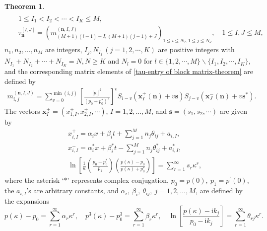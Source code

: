 \documentclass[preprint,3p,10pt]{elsarticle}
\theoremstyle{definition}
\newtheorem{theorem}{Theorem}[section]
\begin{document}
\begin{theorem}
\begin{eqnarray}
\\
&& 1\leq I_1<I_2<\cdots<I_K\leq M,
\\
&& \tau_{\mathbf{n}}^{[I, J]}=\left(m_{(M+1)(i-1)+I,(M+1) (j-1)+J}^{(\mathbf{n},I, J)}\right)_{1 \leq i \leq N_I, 1 \leq j \leq N_J}, \quad 1 \leq I, J \leq M,  \label{tau-entry of block matrix-theorem}
\end{eqnarray}
$n_1, n_2, \ldots, n_M $ are integers,  $ I_j, N_{I_j} \, (j=1,2,\cdots,K)$  are positive integers with $N_{I_1}+N_{I_2}+\cdots+N_{I_K} = N, N \geq K$ and $N_l = 0$ for $l \in \{1,2,\cdots,M\}  \backslash \{I_1,I_2,\cdots,I_K\}$, and the corresponding matrix elements of \eqref{tau-entry of block matrix-theorem} are defined by
\begin{eqnarray} \label{eqn: definition of mij}
    m_{i, j}^{(\mathbf{n},I, J)}=\sum_{v=0}^{\min (i, j)}\left[\frac{\left|p_{1}\right|^{2}}{\left(p_{0}+p_{0}^{*}\right)^{2}}\right]^{v} S_{i-v}\left(\mathbf{x}_I^{+}(\mathbf{n})+v \mathbf{s}\right) S_{j-v}\left(\mathbf{x}_J^{-}(\mathbf{n})+v \mathbf{s}^{*}\right).
\end{eqnarray}
The vectors $\mathbf{x}_{I}^{\pm}
=\left(x_{1,I}^{\pm}, x_{2,I}^{\pm}, \cdots\right)$, $I=1,2,\dots,M$,
and $\mathbf{s}=\left(s_{1}, s_{2}, \cdots\right)$
are given by
\begin{eqnarray}
&&x_{i,I}^{+}=\alpha_i x+\beta_i t+ \sum_{j=1}^{M}n_j \theta_{ij} + a_{i,I}, \label{values of x+} \\
&&x_{i,I}^{-}=\alpha_i^* x+\beta_i^* t-\sum_{j=1}^{M}n_j \theta_{ij}^* +a_{i,I}^*,\\
&&\ln \left[\frac{1}{\kappa}\left(\frac{p_{0}+p_{0}^{*}}{p_{1}}\right)\left(\frac{p(\kappa)-p_{0}}{p(\kappa)+p_{0}^{*}}\right)\right]=\sum_{r=1}^{\infty} s_{r} \kappa^{r}, \label{sr}
\end{eqnarray}
where the asterisk `$*$' represents complex conjugation, $p_0=p(0),~p_1=p^{\prime}(0)$, the $a_{i,I}$'s are arbitrary constants, and $\alpha_i,~\beta_i,~\theta_{ij},~j = 1, 2, \dots, M$, are defined by the expansions
$$
p(\kappa)-p_{0}=\sum_{r=1}^{\infty} \alpha_{r} \kappa^{r}, \quad p^{3}(\kappa)-p_{0}^{3}=\sum_{r=1}^{\infty} \beta_{r} \kappa^{r},\quad\ln \left[\frac{p(\kappa)-\mathrm{i} k_{j}}{p_{0}-\mathrm{i} k_{j}}\right]=\sum_{r=1}^{\infty} \theta_{rj} \kappa^{r}.
$$
\end{theorem}
\end{document}
